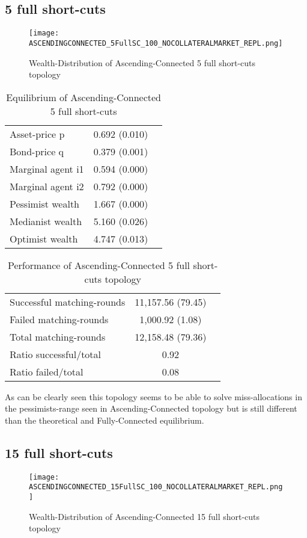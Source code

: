 \documentclass[Bachelorarbeit.tex]{subfiles}
\begin{document}
\subsection{5 full short-cuts}
\begin{figure}[H]
	\centering
  \texttt{[image: ASCENDINGCONNECTED\_5FullSC\_100\_NOCOLLATERALMARKET\_REPL.png]}
	\caption{Wealth-Distribution of Ascending-Connected 5 full short-cuts topology}
	\label{fig:wealth_ASCENDINGCONNECTED_5FullSC_100_NOCOLLATERALMARKET_REPL}
\end{figure}

\begin{table}[H]
	\caption{Equilibrium of Ascending-Connected 5 full short-cuts}
	\centering
	\begin{tabular} { l c r }
		\hline
		Asset-price p & 0.692 (0.010) \\
		Bond-price q & 0.379 (0.001) \\
		Marginal agent i1 & 0.594 (0.000) \\
		Marginal agent i2 & 0.792 (0.000) \\
		\hline
		Pessimist wealth & 1.667 (0.000) \\
		Medianist wealth & 5.160 (0.026) \\
		Optimist wealth & 4.747 (0.013) \\
		\hline
	\end{tabular}
\end{table} 

\begin{table}[H]
	\caption{Performance of Ascending-Connected 5 full short-cuts topology}
	\centering
	\begin{tabular} { l c r }
		\hline
		Successful matching-rounds & 11,157.56 (79.45) \\
		Failed matching-rounds & 1,000.92 (1.08) \\
		Total matching-rounds & 12,158.48 (79.36) \\
		\hline
		Ratio successful/total & 0.92 \\
		Ratio failed/total & 0.08 \\
		\hline
	\end{tabular}
\end{table}

As can be clearly seen this topology seems to be able to solve miss-allocations in the pessimists-range seen in Ascending-Connected topology but is still different than the theoretical and Fully-Connected equilibrium.

\subsection{15 full short-cuts}
\begin{figure}[H]
	\centering
  \texttt{[image: ASCENDINGCONNECTED\_15FullSC\_100\_NOCOLLATERALMARKET\_REPL.png]}
	\caption{Wealth-Distribution of Ascending-Connected 15 full short-cuts topology}
	\label{fig:wealth_ASCENDINGCONNECTED_15FullSC_100_NOCOLLATERALMARKET_REPL}
\end{figure}
\end{document}
